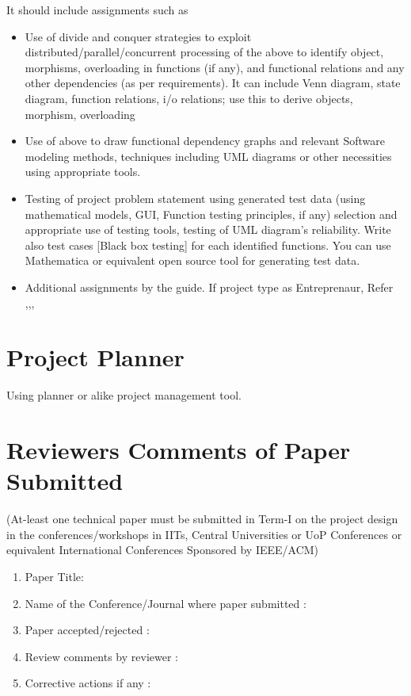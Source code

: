 \documentclass[12pt,a4paper]{article}
\begin{document}
\begin{appendices}
It should include assignments such as
\begin{itemize}
\item Use of divide and conquer strategies to exploit distributed/parallel/concurrent processing of the above to identify object, morphisms, overloading in functions (if any), and functional relations and any other dependencies (as per requirements).
             It can include Venn diagram, state diagram, function relations, i/o relations; use this to derive objects, morphism, overloading

\item Use of above to draw functional dependency graphs and relevant Software modeling methods, techniques
including UML diagrams or other necessities using appropriate tools.
\item Testing of project problem statement using generated test data (using mathematical models, GUI, Function testing principles, if any) selection and appropriate use of testing tools, testing of UML diagram's reliability. Write also test cases [Black box testing] for each identified functions. 
You can use Mathematica or equivalent open source tool for generating test data. 
\item Additional assignments by the guide. If project type as Entreprenaur, Refer \cite{ehr},\cite{mckinsey},\cite{mckinseyweb}, \cite{govwebsite}
\end{itemize}


\section{Project Planner}
\label{app:plan}
Using planner or alike project management tool.




\section{Reviewers Comments of Paper Submitted}
(At-least one technical paper must be submitted in Term-I on the project design in the
conferences/workshops in IITs, Central Universities or UoP Conferences or equivalent International Conferences Sponsored by IEEE/ACM)
\begin{enumerate}
\item Paper Title:
\item Name of the Conference/Journal where paper submitted :
\item Paper accepted/rejected : 
\item Review comments by reviewer :
\item Corrective actions if any :  


\end{enumerate}
\end{appendices}
\end{document}
